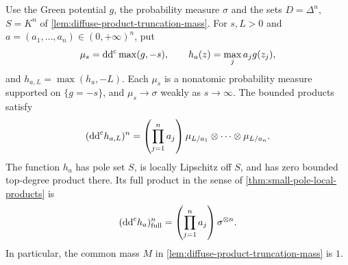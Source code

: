 \begin{lemma}\label{lem:anisotropic-diffuse-product}
Use the Green potential $g$, the probability measure $\sigma$ and the sets $D=\Delta^n$, $S=K^n$ of \cref{lem:diffuse-product-truncation-mass}. For $s,L>0$ and $a=(a_1,\ldots,a_n)\in(0,+\infty)^n$, put
\[
 \mu_s=\mathrm{dd}^{\mathrm{c}}\max(g,-s),\qquad h_a(z)=\max_j a_jg(z_j),
\]
and $h_{a,L}=\max(h_a,-L)$. Each $\mu_s$ is a nonatomic probability measure supported on $\{g=-s\}$, and $\mu_s\to\sigma$ weakly as $s\to\infty$. The bounded products satisfy
\[
 (\mathrm{dd}^{\mathrm{c}} h_{a,L})^n
   =\left(\prod_{j=1}^n a_j\right)
           \mu_{L/a_1}\otimes\cdots\otimes\mu_{L/a_n}.
\]
The function $h_a$ has pole set $S$, is locally Lipschitz off $S$, and has zero bounded top-degree product there. Its full product in the sense of \cref{thm:small-pole-local-products} is
\[
 (\mathrm{dd}^{\mathrm{c}} h_a)^n_{\mathrm{full}}
       =\left(\prod_{j=1}^n a_j\right)\sigma^{\otimes n}.
\]
In particular, the common mass $M$ in \cref{lem:diffuse-product-truncation-mass} is $1$.
\end{lemma}
